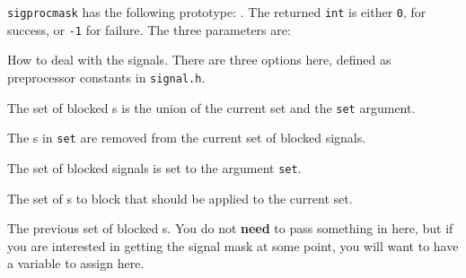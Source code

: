 \texttt{sigprocmask} has the following prototype: .
The returned \texttt{int} is either \texttt{0}, for success, or \texttt{-1} for failure.
The three parameters are:
\begin{description}[noitemsep]
\item[\cinline{how}] How to deal with the signals.
  There are three options here, defined as preprocessor constants in \texttt{signal.h}.
  \begin{description}[noitemsep]
  \item[\cinline{SIG_BLOCK}] The set of blocked s is the union of the current set and the \texttt{set} argument.
  \item[\cinline{SIG_UNBLOCK}] The s in \texttt{set} are removed from the current set of blocked signals.
  \item[\cinline{SIG_SETMASK}] The set of blocked signals is set to the argument \texttt{set}.
  \end{description}
\item[\cinline{*set}] The set of s to block that should be applied to the current set.
\item[\cinline{*oldset}] The previous set of blocked s.
  You do not \textbf{need} to pass something in here, but if you are interested in getting the signal mask at some point, you will want to have a variable to assign here.
\end{description}


